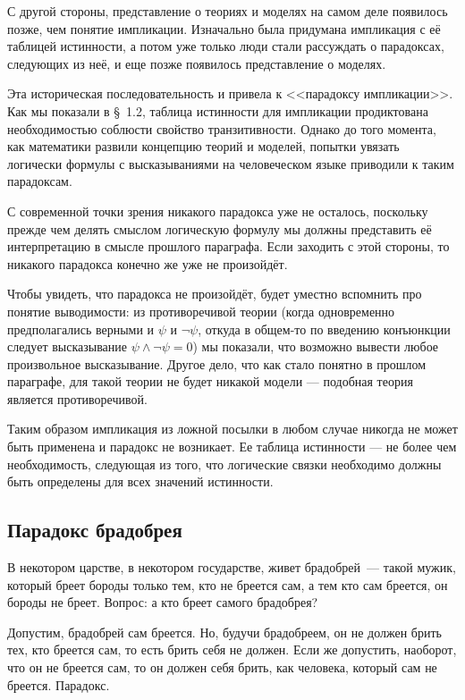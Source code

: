 С другой стороны, представление о теориях и моделях на самом деле появилось позже, чем понятие импликации. Изначально была придумана импликация с её таблицей истинности, а потом уже только люди стали рассуждать о парадоксах, следующих из неё, и еще позже появилось представление о моделях.

Эта историческая последовательность и привела к  <<парадоксу импликации>>. Как мы показали в \S~1.2, таблица истинности для импликации продиктована необходимостью соблюсти свойство транзитивности. Однако до того момента, как математики развили концепцию теорий и моделей, попытки увязать логически формулы с высказываниями на человеческом языке приводили к таким парадоксам.

С современной точки зрения никакого парадокса уже не осталось, поскольку прежде чем делять смыслом логическую формулу мы должны представить её интерпретацию в смысле прошлого параграфа. Если заходить с этой  стороны, то никакого парадокса конечно же уже не произойдёт.

Чтобы увидеть, что парадокса не произойдёт, будет уместно вспомнить про понятие выводимости: из противоречивой теории (когда одновременно предполагались верными и $\psi$ и $\neg\psi$, откуда в общем-то по введению конъюнкции следует высказывание $\psi\wedge\neg\psi=0$) мы показали, что возможно вывести любое произвольное высказывание. Другое дело, что как стало понятно в прошлом параграфе, для такой теории не будет никакой модели — подобная теория является противоречивой.

Таким образом импликация из ложной посылки в любом случае никогда не может быть применена и парадокс не возникает. Ее таблица истинности — не более чем необходимость, следующая из того, что логические связки необходимо должны быть определены для всех значений истинности.

\subsection{Парадокс брадобрея}

В некотором царстве, в некотором государстве, живет брадобрей~--- такой мужик, который бреет бороды только тем, кто не бреется сам, а тем кто сам бреется, он бороды не бреет. Вопрос: а кто бреет самого брадобрея?

Допустим, брадобрей сам бреется. Но, будучи брадобреем, он не должен брить тех, кто бреется сам, то есть брить себя не должен. Если же допустить, наоборот, что он не бреется сам, то он должен себя брить, как человека, который сам не бреется. Парадокс.

